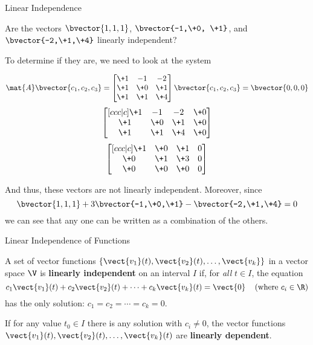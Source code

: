 \documentclass{beamer}
\begin{document}
\begin{frame}{Linear Independence}
\begin{example}
Are the vectors $\bvector{1,1,1}$, $\bvector{-1,\+0, \+1}$, and $\bvector{-2,\+1,\+4}$ linearly independent?

To determine if they are, we need to look at the system
\begin{overprint}
\begin{equation*}
\mat{A}\bvector{c_1,c_2,c_3}=
\begin{bmatrix}
\+1 &  -1 &  -2 \\
\+1 & \+0 & \+1 \\
\+1 & \+1 & \+4 \\
\end{bmatrix}
\bvector{c_1,c_2,c_3}=\bvector{0,0,0}
\end{equation*}
\begin{equation*}
\begin{bmatrix}[ccc|c]
\+1 &  -1 &  -2 & \+0 \\
\+1 & \+0 & \+1 & \+0 \\
\+1 & \+1 & \+4 & \+0 \\
\end{bmatrix}
\end{equation*}
\begin{equation*}
\begin{bmatrix}[ccc|c]
\+1 & \+0 & \+1 & 0 \\
\+0 & \+1 & \+3 & 0 \\
\+0 & \+0 & \+0 & 0 \\
\end{bmatrix}
\end{equation*}
\end{overprint}

And thus, these vectors are not linearly independent.   Moreover, since
\begin{equation*}
\bvector{1,1,1} +3\bvector{-1,\+0,\+1}-\bvector{-2,\+1,\+4}=0
\end{equation*}
we can see that any one can be written as a combination of the others.
\end{example}
\end{frame}

\begin{frame}{Linear Independence of Functions}
\begin{definition}
A set of vector functions $\left\{\vect{v_1}(t),\vect{v_2}(t),\dots,\vect{v_k}\right\}$ in a vector space $\V$ is \textbf{linearly independent} on an interval $I$ if, for \emph{all} $t\in I$, the equation
\begin{equation*}
c_1\vect{v_1}(t)+c_2\vect{v_2}(t)+\cdots+c_k\vect{v_k}(t)=\vect{0}\quad\left(\text{where $c_i\in\R$}\right)
\end{equation*}
has the only solution: $c_1=c_2=\cdots=c_k=0$.

\vspace{.5cm}
If for any value $t_0\in I$ there is any solution with $c_i\neq 0$, the vector functions $\vect{v_1}(t),\vect{v_2}(t),\dots,\vect{v_k}(t)$ are \textbf{linearly dependent}.
\end{definition}
\end{frame}
\end{document}
